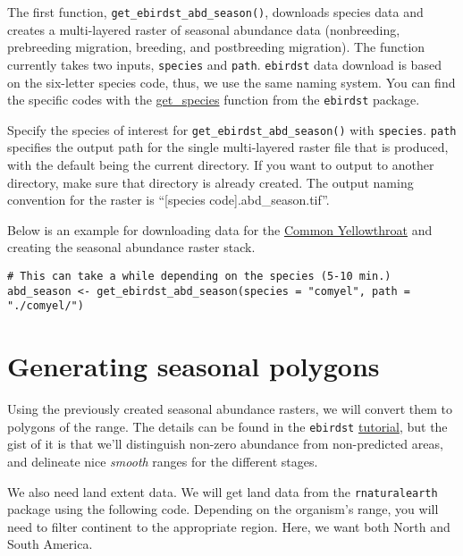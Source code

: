 \documentclass[
]{book}
\begin{document}
The first function, \texttt{get\_ebirdst\_abd\_season()}, downloads species data and creates a multi-layered raster of seasonal abundance data (nonbreeding, prebreeding migration, breeding, and postbreeding migration). The function currently takes two inputs, \texttt{species} and \texttt{path}. \texttt{ebirdst} data download is based on the six-letter species code, thus, we use the same naming system. You can find the specific codes with the \href{https://rdrr.io/github/CornellLabofOrnithology/ebirdst/man/get_species.html}{get\_species} function from the \texttt{ebirdst} package.

Specify the species of interest for \texttt{get\_ebirdst\_abd\_season()} with \texttt{species}. \texttt{path} specifies the output path for the single multi-layered raster file that is produced, with the default being the current directory. If you want to output to another directory, make sure that directory is already created. The output naming convention for the raster is ``{[}species code{]}.abd\_season.tif''.

Below is an example for downloading data for the \href{https://ebird.org/species/comyel}{Common Yellowthroat} and creating the seasonal abundance raster stack.

\begin{verbatim}
# This can take a while depending on the species (5-10 min.)
abd_season <- get_ebirdst_abd_season(species = "comyel", path = "./comyel/")
\end{verbatim}

\hypertarget{generating-seasonal-polygons}{%
\section{Generating seasonal polygons}\label{generating-seasonal-polygons}}

Using the previously created seasonal abundance rasters, we will convert them to polygons of the range. The details can be found in the \texttt{ebirdst} \href{https://cornelllabofornithology.github.io/ebirdst/articles/ebirdst-advanced-mapping.html}{tutorial}, but the gist of it is that we'll distinguish non-zero abundance from non-predicted areas, and delineate nice \emph{smooth} ranges for the different stages.

We also need land extent data. We will get land data from the \texttt{rnaturalearth} package using the following code. Depending on the organism's range, you will need to filter continent to the appropriate region. Here, we want both North and South America.
\end{document}
